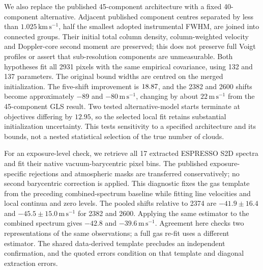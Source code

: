 We also replace the published 45-component architecture with a fixed 40-component alternative. Adjacent published component centres separated by less than $1.025\,\mathrm{km\,s^{-1}}$, half the smallest adopted instrumental FWHM, are joined into connected groups. Their initial total column density, column-weighted velocity and Doppler-core second moment are preserved; this does not preserve full Voigt profiles or assert that sub-resolution components are unmeasurable. Both hypotheses fit all 2931 pixels with the same empirical covariance, using 132 and 137 parameters. The original bound widths are centred on the merged initialization. The five-shift improvement is $18.87$, and the 2382 and 2600 shifts become approximately $-89$ and $-80\,\mathrm{m\,s^{-1}}$, changing by about $22\,\mathrm{m\,s^{-1}}$ from the 45-component GLS result. Two tested alternative-model starts terminate at objectives differing by $12.95$, so the selected local fit retains substantial initialization uncertainty. This tests sensitivity to a specified architecture and its bounds, not a nested statistical selection of the true number of clouds.

\begin{table}[htbp]
\caption{Combined masking/covariance controls and a gas-structure sensitivity test. Here $k_0$ counts the parameters of the conventional hypothesis. Each within-row comparison adds five relative shifts, using the same pixels, covariance and nuisance freedom. The empirical covariance retains the supplied variance amplitude. Results are bounded local fits; solver stopping criteria do not certify global minima. Cross-row objective differences are not independent discovery statistics.}
\label{tab:available_data}
\centering
\small

\end{table}

For an exposure-level check, we retrieve all 17 extracted ESPRESSO S2D spectra and fit their native vacuum-barycentric pixel bins. The published exposure-specific rejections and atmospheric masks are transferred conservatively; no second barycentric correction is applied. This diagnostic fixes the gas template from the preceding combined-spectrum baseline while fitting line velocities and local continua and zero levels. The pooled shifts relative to 2374 are $-41.9\pm16.4$ and $-45.5\pm15.0\,\mathrm{m\,s^{-1}}$ for 2382 and 2600. Applying the same estimator to the combined spectrum gives $-42.8$ and $-39.6\,\mathrm{m\,s^{-1}}$. Agreement here checks two representations of the same observations; a full gas re-fit uses a different estimator. The shared data-derived template precludes an independent confirmation, and the quoted errors condition on that template and diagonal extraction errors.

